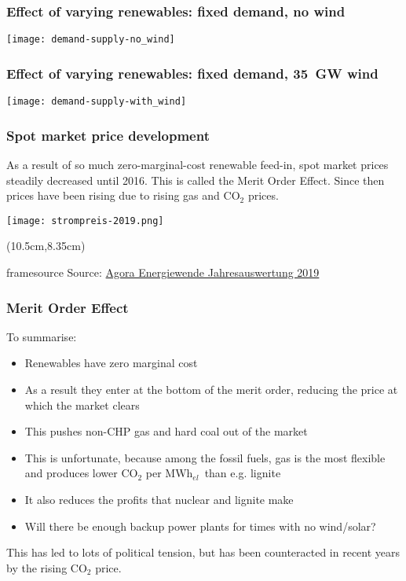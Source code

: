 \documentclass[10pt,aspectratio=169,dvipsnames]{beamer}
\def\co2{CO${}_2$}
\def\el{${}_{el}$}
\newcommand{\source}[1]{\begin{textblock*}{5cm}(10.5cm,8.35cm)
    \begin{beamercolorbox}[ht=0.5cm,right]{framesource}
        \usebeamerfont{framesource}\usebeamercolor[fg]{framesource} Source: {#1}
    \end{beamercolorbox}
\end{textblock*}}
\let\olditem\item
\renewcommand{\item}{%
\olditem\vspace{5pt}}
\begin{document}
\begin{frame}
  \frametitle{Effect of varying renewables: fixed demand, no wind}

  \centering
  \texttt{[image: demand-supply-no\_wind]}

\end{frame}



\begin{frame}
  \frametitle{Effect of varying renewables: fixed demand, 35~GW wind}

  \centering
  \texttt{[image: demand-supply-with\_wind]}

\end{frame}


\begin{frame}
  \frametitle{Spot market price development}

  As a result of so much zero-marginal-cost renewable feed-in, spot
  market prices steadily decreased until 2016. This is called the
  \alert{Merit Order Effect}.  Since then prices have been rising due
  to rising gas and CO$_2$ prices.


  \centering
  \texttt{[image: strompreis-2019.png]}

  \source{\href{https://www.agora-energiewende.de/fileadmin2/Projekte/2019/Jahresauswertung_2019/171_A-EW_Jahresauswertung_2019_WEB.pdf}{Agora Energiewende Jahresauswertung 2019}}
\end{frame}




\begin{frame}
  \frametitle{Merit Order Effect}

  To summarise:
  \begin{itemize}
  \item Renewables have zero marginal cost
  \item As a result they enter at the bottom of the merit order, reducing the price at which the market clears
  \item This pushes non-CHP gas and hard coal out of the market
  \item This is unfortunate, because among the fossil fuels, gas is the most flexible and produces lower \co2
    per MWh\el~than e.g. lignite
  \item It also reduces the profits that nuclear and lignite make
  \item Will there be enough backup power plants for times with no wind/solar?
  \end{itemize}

  This has led to lots of political tension, but has been counteracted in recent years by the rising CO$_2$ price.

\end{frame}
\end{document}
